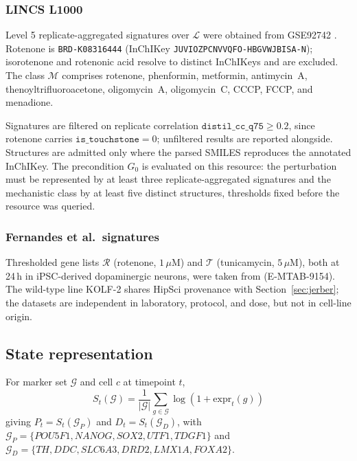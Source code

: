 \documentclass[5p,times,twocolumn]{elsarticle}
\begin{document}
\subsubsection{LINCS L1000}

Level 5 replicate-aggregated signatures over $\mathcal{L}$ were obtained from
GSE92742 \cite{subramanian2017next}. Rotenone is \texttt{BRD-K08316444}
(InChIKey \texttt{JUVIOZPCNVVQFO-HBGVWJBISA-N}); isorotenone and rotenonic acid
resolve to distinct InChIKeys and are excluded. The class $\mathcal{M}$
comprises rotenone, phenformin, metformin, antimycin~A,
thenoyltrifluoroacetone, oligomycin~A, oligomycin~C, CCCP, FCCP, and menadione.

Signatures are filtered on replicate correlation
$\texttt{distil\_cc\_q75} \geq 0.2$, since rotenone carries
$\texttt{is\_touchstone}=0$; unfiltered results are reported alongside.
Structures are admitted only where the parsed SMILES reproduces the annotated
InChIKey.
The precondition $G_0$ is evaluated on this resource: the perturbation must be
represented by at least three replicate-aggregated signatures and the
mechanistic class by at least five distinct structures, thresholds fixed before
the resource was queried.

\subsubsection{Fernandes et al.\ signatures}

Thresholded gene lists $\mathcal{R}$ (rotenone, $1\,\mu$M) and $\mathcal{T}$
(tunicamycin, $5\,\mu$M), both at 24\,h in iPSC-derived dopaminergic neurons,
were taken from \cite{fernandes2020single} (E-MTAB-9154). The wild-type line
KOLF-2 shares HipSci provenance with Section~\ref{sec:jerber}; the datasets are
independent in laboratory, protocol, and dose, but not in cell-line origin.

\subsection{\textbf{State representation}}

For marker set $\mathcal{G}$ and cell $c$ at timepoint $t$,
\begin{equation}
S_t(\mathcal{G}) = \frac{1}{|\mathcal{G}|}\sum_{g\in\mathcal{G}}
\log\!\left(1+\mathrm{expr}_t(g)\right)
\end{equation}
giving $P_t = S_t(\mathcal{G}_P)$ and $D_t = S_t(\mathcal{G}_D)$, with
$\mathcal{G}_P=\{POU5F1,NANOG,SOX2,UTF1,TDGF1\}$ and
$\mathcal{G}_D=\{TH,DDC,SLC6A3,DRD2,LMX1A,FOXA2\}$.
\end{document}
